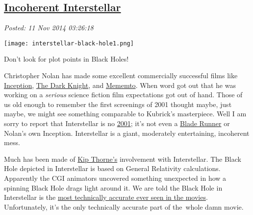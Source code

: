 %

\subsection*{\href{http://bakerjd99.wordpress.com/2014/11/10/incoherent-interstellar/}{Incoherent Interstellar}}


\noindent\emph{Posted: 11 Nov 2014 03:26:18}
\vspace{6pt}



\captionsetup[floatingfigure]{labelformat=empty}
\begin{floatingfigure}[l]{0.28\textwidth}
\centering
\texttt{[image: interstellar-black-hole1.png]}
\caption{Don't look for plot points in Black Holes!}
\label{fig:4883X0}
\end{floatingfigure} Christopher Nolan has made some excellent commercially successful films
like
\href{http://bakerjd99.wordpress.com/2010/07/28/the-20-seconds-that-ruined-inception/}{Inception},
\href{http://www.imdb.com/title/tt0468569/}{The Dark Knight}, and
\href{http://www.rottentomatoes.com/m/memento/}{Mememto}. When word got
out that he was working on a \emph{serious} science fiction film
expectations got out of hand. Those of us old enough to remember the
first screenings of 2001 thought maybe, just maybe, we might see
something comparable to Kubrick's masterpiece. Well I am sorry to report
that Interstellar is no
\href{http://www.rogerebert.com/reviews/great-movie-2001-a-space-odyssey-1968}{2001};
it's not even a \href{http://www.imdb.com/title/tt0083658/}{Blade
Runner} or Nolan's own Inception. Interstellar is a giant, moderately
entertaining, incoherent mess.

Much has been made of \href{http://www.its.caltech.edu/~kip/}{Kip
Thorne's} involvement with Interstellar. The Black Hole depicted in
Interstellar is based on General Relativity calculations. Apparently the
CGI animators uncovered something unexpected in how a spinning Black
Hole drags light around it. We are told the Black Hole in Interstellar
is the
\href{http://www.penny4nasa.org/2014/11/07/how-interstellar-black-hole-led-to-an-actual-scientific-discovery/}{most
technically accurate ever seen in the movies}. Unfortunately, it's the
only technically accurate part of the~whole damn movie.

